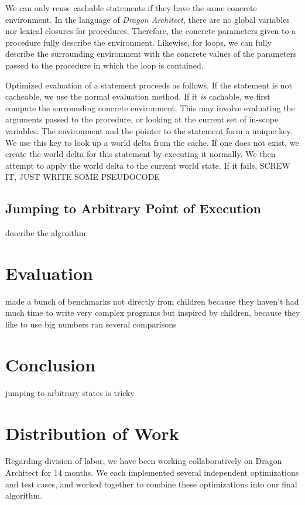 \documentclass{sig-alternate}
\newcommand{\da}{\emph{Dragon Architect}}
\begin{document}
We can only reuse cachable statements if they have the same concrete environment. In the language of \da{}, there are no global variables nor lexical closures for procedures. Therefore, the concrete parameters given to a procedure fully describe the environment. Likewise, for loops, we can fully describe the surrounding environment with the concrete values of the parameters passed to the procedure in which the loop is contained.

Optimized evaluation of a statement proceeds as follows. If the statement is not cacheable, we use the normal evaluation method. If it \emph{is} cachable, we first compute the surrounding concrete environment. This may involve evaluating the arguments passed to the procedure, or looking at the current set of in-scope variables. The environment and the pointer to the statement form a unique key. We use this key to look up a world delta from the cache. If one does not exist, we create the world delta for this statement by executing it normally. We then attempt to apply the world delta to the current world state. If it fails, SCREW IT, JUST WRITE SOME PSEUDOCODE

\subsection{Jumping to Arbitrary Point of Execution}

describe the algroithm

\section{Evaluation}
made a bunch of benchmarks
not directly from children
because they haven't had much time to write very complex programs
but inspired by children, because they like to use big numbers
ran several comparisons

\section{Conclusion}
jumping to arbitrary states is tricky

\section{Distribution of Work}
Regarding division of labor, we have been working collaboratively on Dragon Architect for 14 months. We each implemented several independent optimizations and test cases, and worked together to combine these optimizations into our final algorithm.



\end{document}
